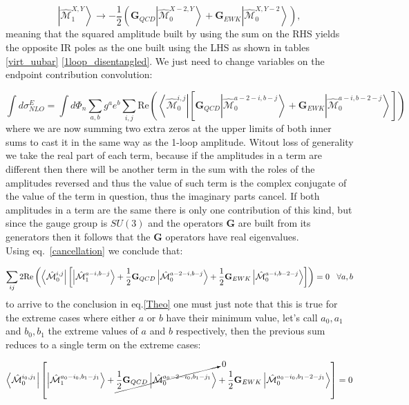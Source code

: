 \documentclass[a4paper]{article}
\def \MBra#1#2#3{\left<\hat{\mathcal{M}}_{#1}^{#2,#3}\right|}
\def \MKet#1#2#3{\left|\hat{\mathcal{M}}_{#1}^{#2,#3}\right>}
\begin{document}
\begin{equation}
 \MKet{1}{X}{Y} \rightarrow -\frac{1}{2}
 \left(
 \textbf{G}_{QCD}\MKet{0}{X-2}{Y} 
 + 
 \textbf{G}_{EWK}\MKet{0}{X}{Y-2}
 \right),
 \label{Theo}
\end{equation}
meaning that the squared amplitude built by using the sum on the RHS yields the opposite IR poles as the 
one built using the LHS as shown in tables \ref{virt_uubar} \ref{1loop_disentangled}. 
We just need to change variables on the endpoint contribution convolution:

\begin{equation}
 \int d\sigma^E_{NLO} = \int d\Phi_{n}
 \sum_{a,b} g^{a} e^{b} 
 \sum_{i,j}
 \text{Re}\left(
 \MBra{0}{i}{j}
 \left[
 \textbf{G}_{QCD}\MKet{0}{a-2-i}{b-j}
 +
 \textbf{G}_{EWK}\MKet{0}{a-i}{b-2-j}
 \right]
 \right)
\end{equation}
where we are now summing two extra zeros at the upper limits of both inner sums to cast it in the same 
way as the 1-loop amplitude. Witout loss of generality we take the real part of each term, 
because if the amplitudes in a term are different then there will be another term in the sum with the roles of the amplitudes reversed and thus the value of such term is the complex conjugate of the value of the term in question, thus the imaginary parts cancel. 
If both amplitudes in a term are the same there is only one contribution of this 
kind, but since the gauge group is $SU(3)$ and the operators $\textbf{G}$ are built from its 
generators then it follows that the $\textbf{G}$ operators have real eigenvalues.\\

Using eq.~\eqref{cancellation} we conclude that:

\begin{equation}
 \sum_{ij}2\text{Re}
 \left(
 \MBra{0}{i}{j}
 \left[
 \MKet{1}{a-i}{b-j}
 +
 \frac{1}{2}\textbf{G}_{QCD}\MKet{0}{a-2-i}{b-j}
 +
 \frac{1}{2}\textbf{G}_{EWK}\MKet{0}{a-i}{b-2-j}
 \right]
 \right)=0 \hskip0.3cm \forall a,b
\end{equation}
to arrive to the conclusion in eq.\eqref{Theo} one must just note that this is true for the extreme cases 
where either $a$ or $b$ have their minimum value, let's call $a_0,a_1$ and $b_0,b_1$ the extreme values of $a$ and $b$ respectively, then the previous sum reduces to a single term on the extreme cases:

\begin{equation}
 \MBra{0}{i_0}{j_1}
 \left[
 \MKet{1}{a_0-i_0}{b_1-j_1}
 +
 \cancelto{0}{\frac{1}{2}\textbf{G}_{QCD}\MKet{0}{a_0-2-i_0}{b_1-j_1}}
 +
 \frac{1}{2}\textbf{G}_{EWK}\MKet{0}{a_0-i_0}{b_1-2-j_1}
 \right]=0
\end{equation}
\end{document}
